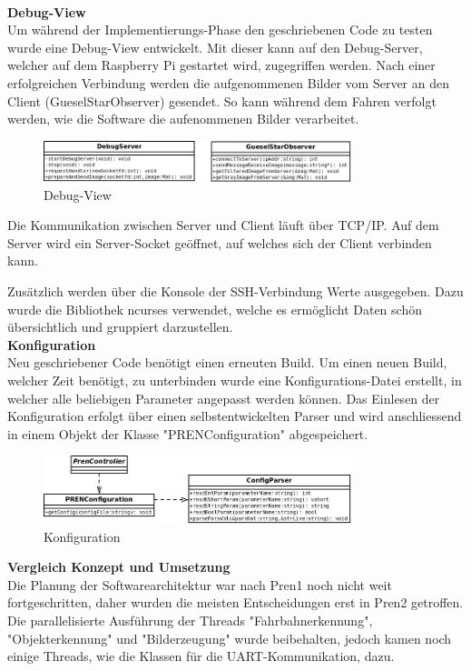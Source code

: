 \\[0.2cm]
\textbf{Debug-View}\\[0.2cm]
Um während der Implementierungs-Phase den geschriebenen Code zu testen wurde eine Debug-View entwickelt. Mit dieser kann auf den Debug-Server, welcher auf dem Raspberry Pi gestartet wird, zugegriffen werden. Nach einer erfolgreichen Verbindung werden die aufgenommenen Bilder vom Server an den Client (GueselStarObserver) gesendet. So kann während dem Fahren verfolgt werden, wie die Software die aufenommenen Bilder verarbeitet.

\begin{figure}[H]
\centering
\includegraphics[width=0.8\textwidth]{03_Loesungskonzept/pictures/DebugView.jpeg}
\caption{Debug-View}
\end{figure}

Die Kommunikation zwischen Server und Client läuft über TCP/IP. Auf dem Server wird ein Server-Socket geöffnet, auf welches sich der Client verbinden kann.

Zusätzlich werden über die Konsole der SSH-Verbindung Werte ausgegeben. Dazu wurde die Bibliothek ncurses verwendet, welche es ermöglicht Daten schön übersichtlich und gruppiert darzustellen.
\\[0.2cm]
\textbf{Konfiguration}\\[0.2cm]
Neu geschriebener Code benötigt einen erneuten Build. Um einen neuen Build, welcher Zeit benötigt, zu unterbinden wurde eine Konfigurations-Datei erstellt, in welcher alle beliebigen Parameter angepasst werden können. Das Einlesen der Konfiguration erfolgt über einen selbstentwickelten Parser und wird anschliessend in einem Objekt der Klasse "{}PRENConfiguration"{} abgespeichert.

\begin{figure}[H]
\centering
\includegraphics[width=0.8\textwidth]{03_Loesungskonzept/pictures/Configuration.jpeg}
\caption{Konfiguration}
\end{figure}

\textbf{Vergleich Konzept und Umsetzung}\\[0.2cm]
Die Planung der Softwarearchitektur war nach Pren1 noch nicht weit fortgeschritten, daher wurden die meisten Entscheidungen erst in Pren2 getroffen. Die parallelisierte Ausführung der Threads "{}Fahrbahnerkennung"{}, "{}Objekterkennung"{} und "{}Bilderzeugung"{} wurde beibehalten, jedoch kamen noch einige Threads, wie die Klassen für die UART-Kommunikation,  dazu.
\newpage
 
